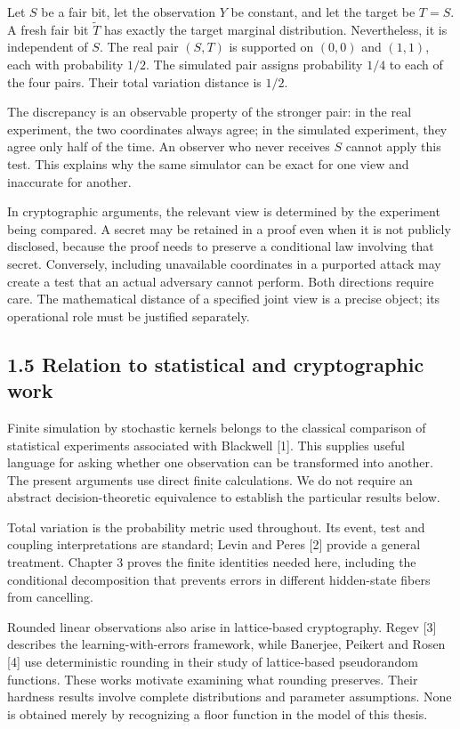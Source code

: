 \documentclass[
]{article}
\begin{document}
Let \(S\) be a fair bit, let the observation \(Y\) be constant, and let
the target be \(T=S\). A fresh fair bit \(\widetilde T\) has exactly the
target marginal distribution. Nevertheless, it is independent of \(S\).
The real pair \((S,T)\) is supported on \((0,0)\) and \((1,1)\), each
with probability \(1/2\). The simulated pair assigns probability \(1/4\)
to each of the four pairs. Their total variation distance is \(1/2\).

The discrepancy is an observable property of the stronger pair: in the
real experiment, the two coordinates always agree; in the simulated
experiment, they agree only half of the time. An observer who never
receives \(S\) cannot apply this test. This explains why the same
simulator can be exact for one view and inaccurate for another.

In cryptographic arguments, the relevant view is determined by the
experiment being compared. A secret may be retained in a proof even when
it is not publicly disclosed, because the proof needs to preserve a
conditional law involving that secret. Conversely, including unavailable
coordinates in a purported attack may create a test that an actual
adversary cannot perform. Both directions require care. The mathematical
distance of a specified joint view is a precise object; its operational
role must be justified separately.

\subsection{1.5 Relation to statistical and cryptographic
work}\label{relation-to-statistical-and-cryptographic-work}

Finite simulation by stochastic kernels belongs to the classical
comparison of statistical experiments associated with Blackwell {[}1{]}.
This supplies useful language for asking whether one observation can be
transformed into another. The present arguments use direct finite
calculations. We do not require an abstract decision-theoretic
equivalence to establish the particular results below.

Total variation is the probability metric used throughout. Its event,
test and coupling interpretations are standard; Levin and Peres {[}2{]}
provide a general treatment. Chapter 3 proves the finite identities
needed here, including the conditional decomposition that prevents
errors in different hidden-state fibers from cancelling.

Rounded linear observations also arise in lattice-based cryptography.
Regev {[}3{]} describes the learning-with-errors framework, while
Banerjee, Peikert and Rosen {[}4{]} use deterministic rounding in their
study of lattice-based pseudorandom functions. These works motivate
examining what rounding preserves. Their hardness results involve
complete distributions and parameter assumptions. None is obtained
merely by recognizing a floor function in the model of this thesis.
\end{document}

